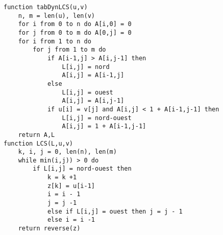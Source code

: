 \documentclass{mybourbaki}
\begin{document}

\begin{lstlisting}
function tabDynLCS(u,v)
	n, m = len(u), len(v)
	for i from 0 to n do A[i,0] = 0
	for j from 0 to m do A[0,j] = 0
	for i from 1 to n do
		for j from 1 to m do
			if A[i-1,j] > A[i,j-1] then
				L[i,j] = nord
				A[i,j] = A[i-1,j]
			else 
				L[i,j] = ouest
				A[i,j] = A[i,j-1]
			if u[i] = v[j] and A[i,j] < 1 + A[i-1,j-1] then
				L[i,j] = nord-ouest
				A[i,j] = 1 + A[i-1,j-1]
	return A,L
function LCS(L,u,v)
	k, i, j = 0, len(n), len(m)
	while min(i,j)) > 0 do
		if L[i,j] = nord-ouest then
			k = k +1
			z[k] = u[i-1]
			i = i - 1
			j = j -1 
			else if L[i,j] = ouest then j = j - 1
			else i = i -1
	return reverse(z)					
\end{lstlisting}
\end{document}
